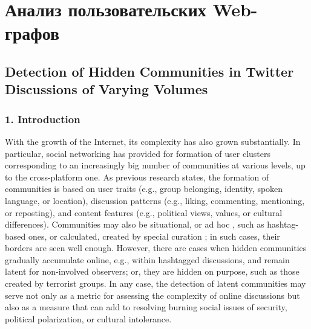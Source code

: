 \section{Анализ пользовательских Web-графов}\label{sec:ch2/sec4}

\subsection{Detection of Hidden Communities in Twitter Discussions of Varying Volumes}\label{subsec:ch2/sec4/sub1}

\subsubsection{1. Introduction}

With the growth of the Internet, its complexity has also grown substantially. In particular, social networking has provided for formation of user clusters corresponding to an increasingly big number of communities at various levels, up to the cross-platform one. As previous research states, the formation of communities is based on user traits (e.g., group belonging, identity, spoken language, or location), discussion patterns (e.g., liking, commenting, mentioning, or reposting), and content features (e.g., political views, values, or cultural differences). Communities may also be situational, or ad hoc \cite{BrunsBurgess}, such as hashtag-based ones, or calculated, created by special curation \cite{BrunsBurgess2015}; in such cases, their borders are seen well enough. However, there are cases when hidden communities gradually accumulate online, e.g., within hashtagged discussions, and remain latent for non-involved observers; or, they are hidden on purpose, such as those created by terrorist groups. In any case, the detection of latent communities may serve not only as a metric for assessing the complexity of online discussions but also as a measure that can add to resolving burning social issues of security, political polarization, or cultural intolerance.

